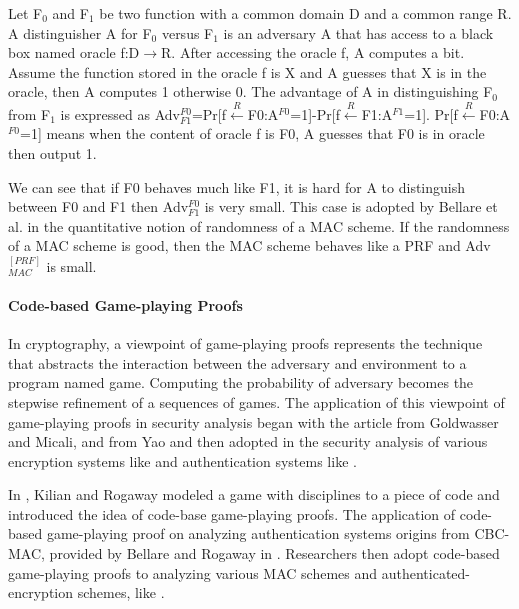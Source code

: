 \documentclass{article}
\begin{document}
Let F$_0$ and F$_1$ be two function with a common domain D and a common range R. A distinguisher A for F$_0$ versus F$_1$ is an adversary A that has access to a black box named oracle f:D$\longrightarrow$R. After accessing the oracle f, A computes a bit. Assume the function stored in the oracle f is X and A guesses that X is in the oracle, then A computes 1 otherwise 0. The advantage of A in distinguishing F$_0$ from F$_1$ is expressed as Adv$^{F0}_{F1}$=Pr[f$\stackrel{R}{\longleftarrow}$F0:A$^{F0}$=1]-Pr[f$\stackrel{R}{\longleftarrow}$F1:A$^{F1}$=1]. Pr[f$\stackrel{R}{\longleftarrow}$F0:A$^{F0}$=1] means when the content of oracle f is F0, A guesses that F0 is in oracle then output 1.

We can see that if F0 behaves much like F1, it is hard for A to distinguish between F0 and F1 then Adv$^{F0}_{F1}$ is very small. This case is adopted by Bellare et al. in the quantitative notion of randomness of a MAC scheme. If the randomness of a MAC scheme is good, then the MAC scheme behaves like a PRF and Adv$^{[PRF]}_{MAC}$ is small. 


\paragraph{Code-based Game-playing Proofs}
In cryptography, a viewpoint of game-playing proofs represents the technique that abstracts the interaction between the adversary and environment to a program named game. Computing the probability of adversary becomes the stepwise refinement of a sequences of games. 
The application of this viewpoint of game-playing proofs in security analysis
began with the article\cite{goldwasser1984probabilistic} from Goldwasser and
Micali, and\cite{yao1982theory} from Yao and then adopted in the
security analysis of various encryption systems like\cite{shoup2000using} and
authentication systems like \cite{bellare1990new}.  

In \cite{kilian1996protect}, Kilian and Rogaway
modeled a game with disciplines to a piece of code and introduced the idea of
code-base game-playing proofs. The application of code-based game-playing
proof on analyzing authentication systems origins from CBC-MAC, provided by
Bellare and Rogaway in \cite{code-game}. Researchers then adopt code-based game-playing
proofs to analyzing various MAC schemes and authenticated-encryption schemes,
like \cite{yasuda2011new}. 
\end{document}
